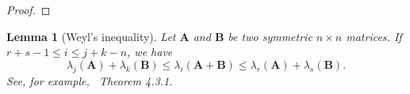 \documentclass[12pt]{article} %
\newcommand{\bA}{\mathbf{A}}
\newcommand{\bB}{\mathbf{B}}
\newtheorem{lemma}{Lemma}
\theoremstyle{definition}
\begin{document}
\begin{appendices}
\begin{proof}
\end{proof}
    \begin{lemma}[Weyl's inequality]
        Let $\bA$ and $\bB$ be two symmetric $n\times n$ matrices. If $r+s-1\leq i \leq j+k-n$, we have
        $$
        \lambda_j(\bA) +\lambda_k(\bB)\leq \lambda_i (\bA+\bB) \leq
        \lambda_r(\bA)+\lambda_s(\bB).
        $$
        See, for example,~\citet{Horn1985Matrix} Theorem 4.3.1.
\end{lemma}


\end{appendices}
\end{document}
